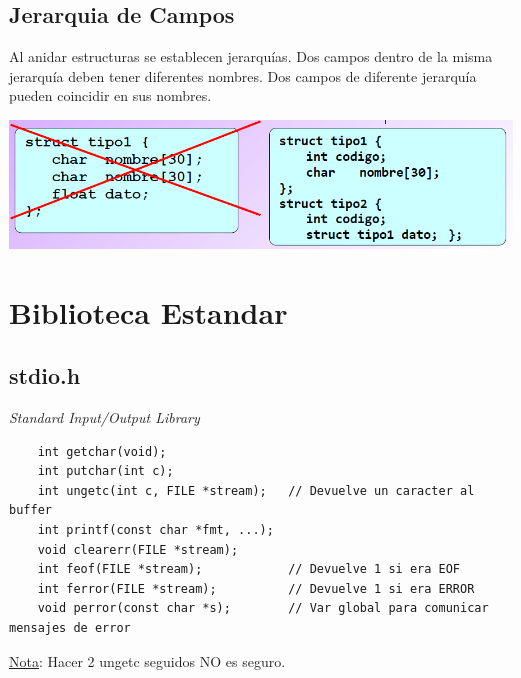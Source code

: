 \documentclass{article}
\begin{document}
\subsection*{Jerarquia de Campos}
Al anidar estructuras se establecen jerarquías.
Dos campos dentro de la misma jerarquía deben tener diferentes nombres.
Dos campos de diferente jerarquía pueden coincidir en sus nombres.
\begin{center}
    \includegraphics[width=\textwidth]{jerarquiaCampos.PNG}
\end{center}
\newpage
\section{Biblioteca Estandar}
\subsection{stdio.h}
\emph{Standard Input/Output Library}
\begin{lstlisting}
    int getchar(void);
    int putchar(int c);
    int ungetc(int c, FILE *stream);   // Devuelve un caracter al buffer
    int printf(const char *fmt, ...);
    void clearerr(FILE *stream);
    int feof(FILE *stream);            // Devuelve 1 si era EOF
    int ferror(FILE *stream);          // Devuelve 1 si era ERROR
    void perror(const char *s);        // Var global para comunicar mensajes de error
\end{lstlisting}
\underline{Nota}: Hacer 2 ungetc seguidos NO es seguro.
\end{document}
